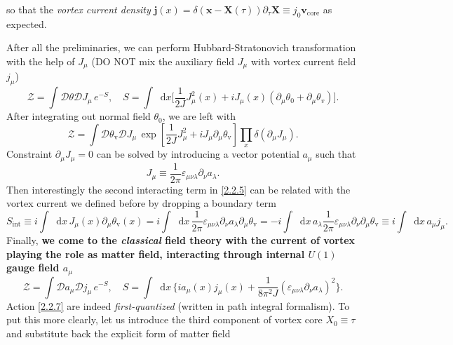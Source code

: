 \documentclass[10pt,nofootinbib]{revtex4}
\newcommand*\dd{\mathop{}\!\mathrm{d}}
\def\Z{\mathcal{Z}}
\numberwithin{equation}{section}
\begin{document}
		so that the \emph{vortex current density} $\bm{j}(x)=\delta(\bm{x}-\bm{X}(\tau)) \partial_\tau\bm{X}\equiv j_0\bm{v}_{\text{core}}$ as expected.\par
		After all the preliminaries, we can perform Hubbard-Stratonovich transformation with the help of $J_\mu$ (DO NOT mix the auxiliary field $J_\mu$ with vortex current field $j_\mu$)
		\begin{equation}\label{2.2.4}
			\Z=\int\mathcal{D}\theta\mathcal{D}J_\mu\,e^{-S},\quad S=\int\dd x\bigg[\dfrac{1}{2J}J_\mu^2(x)+iJ_\mu(x)(\partial_\mu\theta_0+\partial_\mu\theta_v)\bigg].
		\end{equation}
		After integrating out normal field $\theta_0$, we are left with
		\begin{equation}\label{2.2.5}
			\Z=\int\mathcal{D}\theta_{\mathrm{v}}\mathcal{D}J_\mu\,\exp\left[\dfrac{1}{2J}J_\mu^2+iJ_\mu\partial_\mu\theta_{\mathrm{v}}\right]\prod_{x}\delta(\partial_\mu J_\mu).
		\end{equation}
		Constraint $\partial_\mu J_\mu=0$ can be solved by introducing a vector potential $a_\mu$ such that
		\begin{equation}\label{2.2.6}
			J_\mu\equiv\dfrac{1}{2\pi}\varepsilon_{\mu\nu\lambda}\partial_\nu a_\lambda.
		\end{equation}
		Then interestingly the second interacting term in \eqref{2.2.5} can be related with the vortex current we defined before by dropping a boundary term
		\begin{equation*}
			S_{\text{int}}\equiv i\int\dd x\,J_\mu(x)\partial_\mu\theta_{\mathrm{v}}(x)=i\int\dd x\,\dfrac{1}{2\pi}\varepsilon_{\mu\nu\lambda}\partial_\nu a_\lambda \partial_\mu\theta_{\mathrm{v}}=-i\int\dd x\,a_\lambda\dfrac{1}{2\pi}\varepsilon_{\mu\nu\lambda}\partial_\nu \partial_\mu\theta_{\mathrm{v}}\equiv i\int\dd x\,a_\mu j_\mu.
		\end{equation*}
		Finally, {\bf{we come to the \emph{classical} field theory with the current of vortex playing the role as matter field, interacting through internal $U(1)$ gauge field $a_\mu$}}
		\begin{equation}\label{2.2.7}
			\Z=\int\mathcal{D}a_\mu\mathcal{D}j_\mu\,e^{-S},\quad S=\int\dd x\, \bigg\{ia_\mu(x)j_\mu(x)+\dfrac{1}{8\pi^2 J} (\varepsilon_{\mu\nu\lambda}\partial_\nu a_{\lambda})^2\bigg\}.
		\end{equation}
		{\color{red}Action \eqref{2.2.7} are indeed \emph{first-quantized}} (written in path integral formalism). To put this more clearly, let us introduce the third component of vortex core $X_0\equiv\tau$ and substitute back the explicit form of matter field
\end{document}

